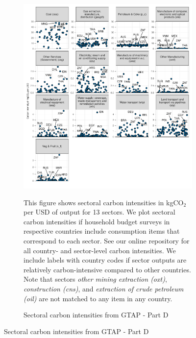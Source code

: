 \begin{figure}[ht!]\ContinuedFloat
\begin{subfigure}[b]{\textwidth}
  \centering
  \includegraphics{Analysis_Carbon_Intensities_GTAP/Figure_2.1.1_D_2017B.pdf}
  \caption{Sectoral carbon intensities from GTAP - Part D} \label{fig:B4}  
  \begin{subcaption2}
    This figure shows sectoral carbon intensities in kgCO$_{2}$ per USD of output for 13 sectors. We plot sectoral carbon intensities if household budget surveys in respective countries include consumption items that correspond to each sector. See our online repository for all country- and sector-level carbon intensities. We include labels with country codes if sector outputs are relatively carbon-intensive compared to other countries. Note that sectors \textit{other mining extraction (oxt)}, \textit{construction (cns)}, and \textit{extraction of crude petroleum (oil)} are not matched to any item in any country.
  \end{subcaption2}
\end{subfigure}
\end{figure}

\clearpage